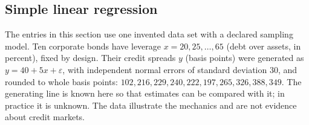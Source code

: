 \subsection{Simple linear regression}

The entries in this section use one invented data set with a declared sampling model. Ten corporate bonds have leverage $x=20, 25, \dots, 65$ (debt over assets, in percent), fixed by design. Their credit spreads $y$ (basis points) were generated as $y=40+5x+\varepsilon$, with independent normal errors of standard deviation 30, and rounded to whole basis points: $102, 216, 229, 240, 222, 197, 265, 326, 388, 349$. The generating line is known here so that estimates can be compared with it; in practice it is unknown. The data illustrate the mechanics and are not evidence about credit markets.

